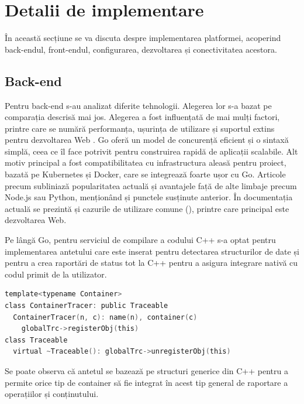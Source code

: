 \chapter{Detalii de implementare}
\label{chapter:implementare}

În această secțiune se va discuta despre implementarea platformei, acoperind back-endul, front-endul, configurarea,
dezvoltarea și conectivitatea acestora. 

\section{Back-end}
\label{sec:implementare-backend}


Pentru back-end s-au analizat diferite tehnologii. Alegerea lor s-a bazat pe comparația descrisă mai jos.
Alegerea a fost influențată de mai mulți factori, printre care se numără performanța, ușurința de utilizare
și suportul extins pentru dezvoltarea Web . Go oferă un model de concurență eficient și o sintaxă simplă, 
ceea ce îl face potrivit pentru construirea rapidă de aplicații scalabile. Alt motiv principal a fost compatibilitatea
cu infrastructura aleasă pentru proiect, bazată pe Kubernetes și Docker, care se integrează foarte ușor cu Go.
Articole precum \cite{goDev} subliniază popularitatea actuală și avantajele față de alte limbaje precum Node.js sau Python,
menționând și punctele susținute anterior. În documentația actuală se prezintă și cazurile de utilizare comune (\cite{golang2024}), printre
care principal este dezvoltarea Web.

Pe lângă Go, pentru serviciul de compilare a codului C++ s-a optat pentru implementarea antetului
care este inserat pentru detectarea structurilor de date și pentru a crea raportări de status tot la C++ 
pentru a asigura integrare nativă cu codul primit de la utilizator.


\begin{lstlisting}[language=Go, caption={Antetul pentru raportarea operațiilor în C++}]
template<typename Container>
class ContainerTracer: public Traceable 
  ContainerTracer(n, c): name(n), container(c) 
    globalTrc->registerObj(this)
class Traceable
  virtual ~Traceable(): globalTrc->unregisterObj(this)
\end{lstlisting}

Se poate observa că antetul se bazează pe structuri generice din C++ pentru a permite orice tip de container
să fie integrat în acest tip general de raportare a operațiilor și conținutului.

